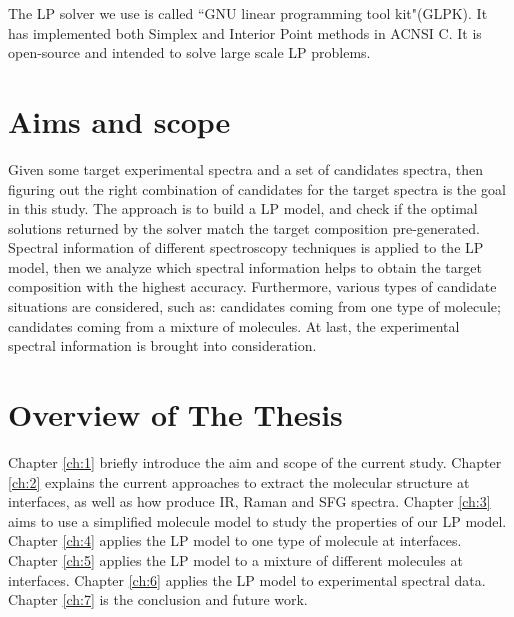 The LP solver we use is called ``GNU linear programming tool kit"(GLPK). It has implemented both Simplex and Interior Point methods in ACNSI C. It is open-source and intended to solve large scale LP problems. \\
	
\section{Aims and scope}
Given some target experimental spectra and a set of candidates spectra, then figuring out the right combination of candidates for the target spectra is the goal in this study. The approach is to build a LP model, and check if the optimal solutions returned by the solver match the target composition pre-generated. Spectral information of different spectroscopy techniques is applied to the LP model, then we analyze which spectral information helps to obtain the target composition with the highest accuracy. Furthermore, various types of candidate situations are considered, such as: candidates coming from one type of molecule; candidates coming from a mixture of molecules. At last, the experimental spectral information is brought into consideration. 

\section{Overview of The Thesis}
Chapter \ref{ch:1} briefly introduce the aim and scope of the current study. Chapter \ref{ch:2} explains the current approaches to extract the molecular structure at interfaces, as well as how produce IR, Raman and SFG spectra. Chapter \ref{ch:3} aims to use a simplified molecule model to study the properties of our LP model. Chapter \ref{ch:4} applies the LP model to one type of molecule at interfaces. Chapter \ref{ch:5} applies the LP model to a mixture of different molecules at interfaces. Chapter \ref{ch:6} applies the LP model to experimental spectral data. Chapter \ref{ch:7} is the conclusion and future work.
